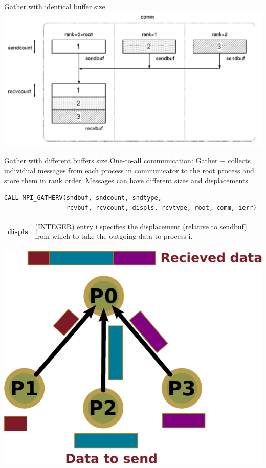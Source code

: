 \documentclass[aspectratio=43]{beamer}
\begin{document}
\begin{frame}{Gather with identical buffer size}
\includegraphics[scale=0.5]{03.MPI_Coll/gather1.pdf}
\end{frame}

\begin{frame}[fragile]{Gather with different buffers size}
One-to-all communication: Gather + collects individual messages from each process in communicator to the root process and store them in rank order. Messages can have different sizes and displacements.\\
\footnotesize
\begin{verbatim}
CALL MPI_GATHERV(sndbuf, sndcount, sndtype,
                 rcvbuf, rcvcount, displs, rcvtype, root, comm, ierr)
\end{verbatim}
\normalsize
\begin{black1block}{}
\begin{tabular}{rp{8cm}}
\textbf{displs} & (INTEGER) entry i specifies the displacement (relative to sendbuf) from which to take the outgoing data to process i.\\
\end{tabular}
\end{black1block}
\begin{center}
\includegraphics[scale=0.4]{03.MPI_Coll/gatherv.pdf}
\end{center}
\end{frame}
\end{document}
